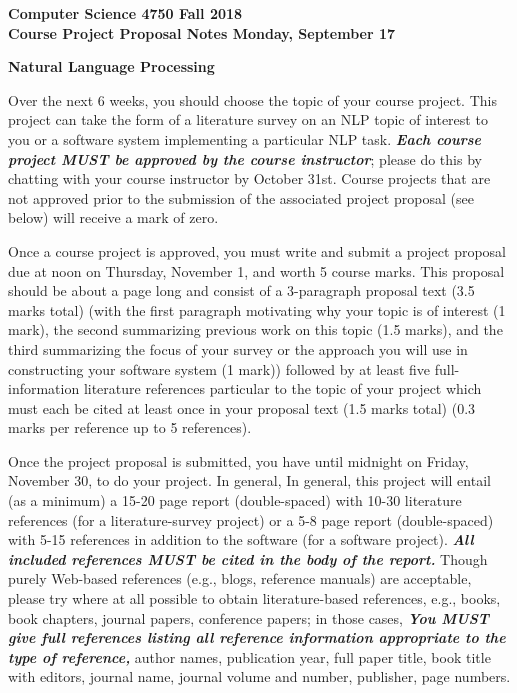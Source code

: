 \documentclass{article}
\begin{document}
	{\bfseries
		Computer Science 4750 \hfill Fall 2018 \\
		Course Project Proposal Notes \hfill Monday, September 17%
	}
	\begin{center}
		\Large\bfseries Natural Language Processing
	\end{center}

	Over the next 6 weeks, you should choose the topic of your course project. This project can take the form of a literature survey on an NLP topic of interest to you or a software system implementing a particular NLP task. {\em \bfseries Each course project MUST be approved by the course instructor}; please do this by chatting with your course instructor by October 31st. Course projects that are not approved prior to the submission of the associated project proposal (see below) will receive a mark of zero.
	
	Once a course project is approved, you must write and submit a project proposal due at noon on Thursday, November 1, and worth 5 course marks. This proposal should be about a page long and consist of a 3-paragraph proposal text (3.5 marks total) (with the first paragraph motivating why your topic is of interest (1 mark), the second summarizing previous work on this topic (1.5 marks), and the third summarizing the focus of your survey or the approach you will use in constructing your software system (1 mark)) followed by at least five full-information literature references particular to the topic of your project which must each be cited at least once in your proposal text (1.5 marks total) (0.3 marks per reference up to 5 references).
	
	Once the project proposal is submitted, you have until midnight on Friday, November 30, to do your project. In general, In general, this project will entail (as a minimum) a 15-20 page report (double-spaced) with 10-30 literature references (for a literature-survey project) or a 5-8 page report (double-spaced) with 5-15 references in addition to the software (for a software project). {\em \bfseries All included references MUST be cited in the body of the report.} Though purely Web-based references (e.g., blogs, reference manuals) are acceptable, please try where at all possible to obtain literature-based references, e.g., books, book chapters, journal papers, conference papers; in those cases, {\em \bfseries You MUST give full references listing all reference information appropriate to the type of reference,} author names, publication year, full paper title, book title with editors, journal name, journal volume and number, publisher, page numbers.
	
\end{document}
